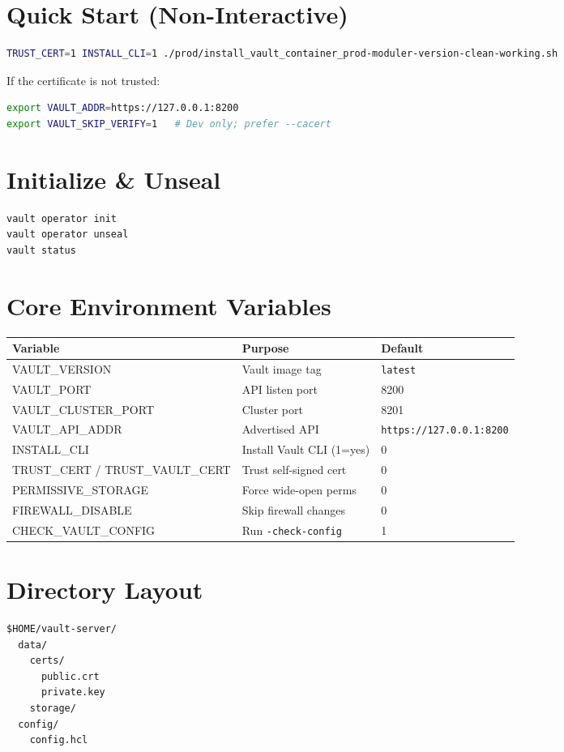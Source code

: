 \documentclass[12pt]{article}
\begin{document}
\section{Quick Start (Non-Interactive)}
\begin{lstlisting}[language=bash]
TRUST_CERT=1 INSTALL_CLI=1 ./prod/install_vault_container_prod-moduler-version-clean-working.sh
\end{lstlisting}
If the certificate is not trusted:
\begin{lstlisting}[language=bash]
export VAULT_ADDR=https://127.0.0.1:8200
export VAULT_SKIP_VERIFY=1   # Dev only; prefer --cacert
\end{lstlisting}

\section{Initialize \& Unseal}
\begin{lstlisting}[language=bash]
vault operator init
vault operator unseal
vault status
\end{lstlisting}

\section{Core Environment Variables}
\footnotesize
\begin{longtable}{@{}p{3.5cm}p{4.5cm}p{2.5cm}@{}}
\toprule
Variable & Purpose & Default \\
\midrule
\endhead
VAULT\_VERSION & Vault image tag & \texttt{latest} \\
VAULT\_PORT & API listen port & 8200 \\
VAULT\_CLUSTER\_PORT & Cluster port & 8201 \\
VAULT\_API\_ADDR & Advertised API & \texttt{https://127.0.0.1:8200} \\
INSTALL\_CLI & Install Vault CLI (1=yes) & 0 \\
TRUST\_CERT / TRUST\_VAULT\_CERT & Trust self-signed cert & 0 \\
PERMISSIVE\_STORAGE & Force wide-open perms & 0 \\
FIREWALL\_DISABLE & Skip firewall changes & 0 \\
CHECK\_VAULT\_CONFIG & Run \texttt{-check-config} & 1 \\
\bottomrule
\end{longtable}
\normalsize

\section{Directory Layout}
\begin{lstlisting}
$HOME/vault-server/
  data/
    certs/
      public.crt
      private.key
    storage/
  config/
    config.hcl
\end{lstlisting}
\end{document}
